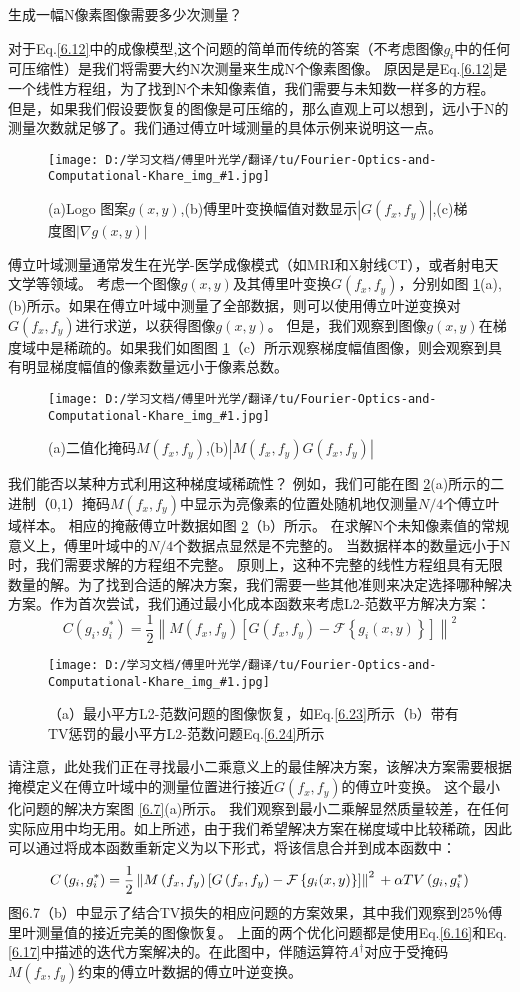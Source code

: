 \documentclass[12pt, UTF8]{ctexart}%
\numberwithin{equation}{section}
\numberwithin{figure}{section}
\newcommand {\InsertPic}[3]{\begin{figure}[htbp]\centering \texttt{[image: D:/学习文档/傅里叶光学/翻译/tu/Fourier-Optics-and-Computational-Khare\_img\_\#1.jpg]}\caption{#3}  \label{#2}\end{figure}}%
\newcommand{\InsertEqution}[2]{\begin{equation}
  \label{#1}
   #2
 \end{equation}}
\newcommand{\RefEq}[1]{Eq.\ref{#1}}
\newcommand{\InsertInlineEq}[1]{$#1$}
\newcommand{\RefFig}[1]{图 \ref{#1}}
\begin{document}
\begin{sloppypar}
生成一幅N像素图像需要多少次测量？

对于\RefEq{6.12}中的成像模型,这个问题的简单而传统的答案（不考虑图像\InsertInlineEq{g_i}中的任何可压缩性）是我们将需要大约N次测量来生成N个像素图像。 原因是是\RefEq{6.12}是一个线性方程组，为了找到N个未知像素值，我们需要与未知数一样多的方程。   但是，如果我们假设要恢复的图像是可压缩的，那么直观上可以想到，远小于N的测量次数就足够了。我们通过傅立叶域测量的具体示例来说明这一点。
\InsertPic{27}{F6.5}{(a)Logo 图案\InsertInlineEq{g(x,y)},(b)傅里叶变换幅值对数显示\InsertInlineEq{|G(f_x,f_y)|},(c)梯度图\InsertInlineEq{|\nabla g(x, y)|}}
傅立叶域测量通常发生在光学-医学成像模式（如MRI和X射线CT），或者射电天文学等领域。 考虑一个图像\InsertInlineEq{g(x,y)}及其傅里叶变换\InsertInlineEq{G(f_x,f_y)}，分别如\RefFig{F6.5}(a),(b)所示。如果在傅立叶域中测量了全部数据，则可以使用傅立叶逆变换对\InsertInlineEq{G(f_x,f_y)}进行求逆，以获得图像\InsertInlineEq{g(x,y)}。 但是，我们观察到图像\InsertInlineEq{g(x,y)}在梯度域中是稀疏的。如果我们如图\RefFig{F6.5}（c）所示观察梯度幅值图像，则会观察到具有明显梯度幅值的像素数量远小于像素总数。
\InsertPic{28}{F6.6}{(a)二值化掩码\InsertInlineEq{M(f_x,f_y)},(b)\InsertInlineEq{|M(f_x,f_y)G(f_x,f_y)|}}
我们能否以某种方式利用这种梯度域稀疏性？ 例如，我们可能在\RefFig{F6.6}(a)所示的二进制（0,1）掩码\InsertInlineEq{M(f_x,f_y)}中显示为亮像素的位置处随机地仅测量\InsertInlineEq{N/4}个傅立叶域样本。 相应的掩蔽傅立叶数据如\RefFig{F6.6}（b）所示。 在求解N个未知像素值的常规意义上，傅里叶域中的\InsertInlineEq{N/4}个数据点显然是不完整的。 当数据样本的数量远小于N时，我们需要求解的方程组不完整。 原则上，这种不完整的线性方程组具有无限数量的解。为了找到合适的解决方案，我们需要一些其他准则来决定选择哪种解决方案。作为首次尝试，我们通过最小化成本函数来考虑L2-范数平方解决方案：
\InsertEqution{6.23}{C\left(g_{i}, g_{i}^{*}\right)=\frac{1}{2}\left\|M\left(f_{x}, f_{y}\right)\left[G\left(f_{x}, f_{y}\right)-\mathcal{F}\left\{g_{i}(x, y)\right\}\right]\right\|^{2}}
\InsertPic{29}{F6.7}{（a）最小平方L2-范数问题的图像恢复，如\RefEq{6.23}所示（b）带有TV惩罚的最小平方L2-范数问题\RefEq{6.24}所示}
请注意，此处我们正在寻找最小二乘意义上的最佳解决方案，该解决方案需要根据掩模定义在傅立叶域中的测量位置进行接近\InsertInlineEq{G(f_x,f_y)}的傅立叶变换。 这个最小化问题的解决方案\RefFig{6.7}(a)所示。 我们观察到最小二乘解显然质量较差，在任何实际应用中均无用。如上所述，由于我们希望解决方案在梯度域中比较稀疏，因此可以通过将成本函数重新定义为以下形式，将该信息合并到成本函数中：
\InsertEqution{6.24}{
  C\left(g_{i}, g_{i}^{*}\right)=\frac{1}{2}\left\|M\left(f_{x}, f_{y}\right)\left[G\left(f_{x}, f_{y}\right)-\mathcal{F}\left\{g_{i}(x, y)\right\}\right]\right\|^{2} \\
  +\alpha T V\left(g_{i}, g_{i}^{*}\right)}
  图6.7（b）中显示了结合TV损失的相应问题的方案效果，其中我们观察到25％傅里叶测量值的接近完美的图像恢复。 上面的两个优化问题都是使用\RefEq{6.16}和\RefEq{6.17}中描述的迭代方案解决的。在此图中，伴随运算符\InsertInlineEq{A^{\dagger}}对应于受掩码\InsertInlineEq{M(f_x,f_y)}约束的傅立叶数据的傅立叶逆变换。

\end{sloppypar}
\end{document}
